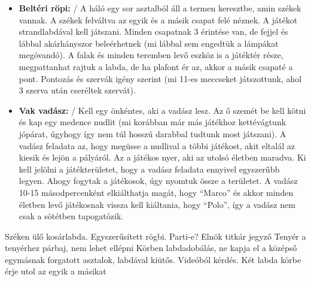 \documentclass[a4paper, 12pt, twoside, openright]{article}
\begin{document}
\begin{itemize}
\item \textbf{Beltéri röpi:} / A háló egy sor asztalból áll a termen keresztbe, amin székek vannak. A székek felváltva az egyik és a másik csapat felé néznek. A játékot strandlabdával kell játszani. Minden csapatnak 3 érintése van, de fejjel és lábbal akárhányszor beleérhetnek (mi lábbal sem engedtük a lámpákat megóvandó). A falak és minden teremben levő eszköz is a játéktér része, megpattanhat rajtuk a labda, de ha plafont ér az, akkor a másik csapaté a pont. Pontozás és szervák igény szerint (mi 11-es meccseket játszottunk, ahol 3 szerva után cseréltek szervát).

\item \textbf{Vak vadász:} / Kell egy önkéntes, aki a vadász lesz. Az ő szemét be kell kötni és kap egy medence nudlit (mi korábban már más játékhoz kettévágtunk jópárat, úgyhogy így nem túl hosszú darabbal tudtunk most játszani). A vadász feladata az, hogy megüsse a nudlival a többi játékost, akit eltalál az kiesik és lejön a pályáról. Az a játékos nyer, aki az utolsó életben maradva. Ki kell jelölni a játékterületet, hogy a vadász feladata ennyivel egyszerűbb legyen. Ahogy fogytak a játékosok, úgy nyomtuk össze a területet. A vadász 10-15 másodpercenként elkiálthatja magát, hogy “Marco” és akkor minden életben levő játékosnak vissza kell kiáltania, hogy “Polo”, így a vadász nem csak a sötétben tapogatózik.
\end{itemize}

Széken ülő kosárlabda.
Egyszerűsített rögbi.
Parti-e?
Elnök titkár jegyző
Tenyér a tenyérhez párbaj, nem lehet ellépni
Körben labdadobálás, ne kapja el a középső
egymásnak forgatott asztalok, labdával kiütős.
Videóból kérdés.
Két labda körbe érje utol az egyik a másikat
\end{document}

